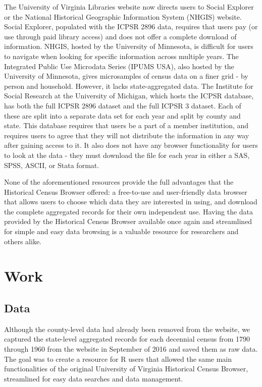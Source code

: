 \documentclass[11pt,]{article}
\begin{document}
The University of Virginia Libraries website now directs users to Social
Explorer or the National Historical Geographic Information System
(NHGIS) website. Social Explorer, populated with the ICPSR 2896 data,
requires that users pay (or use through paid library access) and does
not offer a complete download of information. NHGIS, hosted by the
University of Minnesota, is difficult for users to navigate when looking
for specific information across multiple years. The Integrated Public
Use Microdata Series (IPUMS USA), also hosted by the University of
Minnesota, gives microsamples of census data on a finer grid - by person
and household. However, it lacks state-aggregated data. The Institute
for Social Research at the University of Michigan, which hosts the ICPSR
database, has both the full ICPSR 2896 dataset and the full ICPSR 3
dataset. Each of these are split into a separate data set for each year
and split by county and state. This database requires that users be a
part of a member institution, and requires users to agree that they will
not distribute the information in any way after gaining access to it. It
also does not have any browser functionality for users to look at the
data - they must download the file for each year in either a SAS, SPSS,
ASCII, or Stata format.

None of the aforementioned resources provide the full advantages that
the Historical Census Browser offered: a free-to-use and user-friendly
data browser that allows users to choose which data they are interested
in using, and download the complete aggregated records for their own
independent use. Having the data provided by the Historical Census
Browser available once again and streamlined for simple and easy data
browsing is a valuable resource for researchers and others alike.

\section{Work}

\subsection{Data}

Although the county-level data had already been removed from the
website, we captured the state-level aggregated records for each
decennial census from 1790 through 1960 from the website in September of
2016 and saved them as raw data. The goal was to create a resource for R
users that allowed the same main functionalities of the original
University of Virginia Historical Census Browser, streamlined for easy
data searches and data management.
\end{document}
